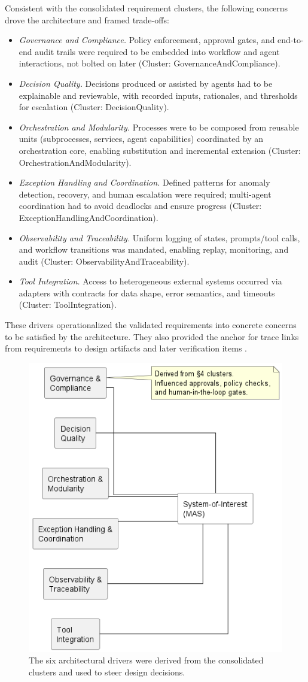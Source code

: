 Consistent with the consolidated requirement clusters, the following concerns drove the architecture and framed trade-offs:
\begin{itemize}
\item \emph{Governance and Compliance.} Policy enforcement, approval gates, and end-to-end audit trails were required to be embedded into workflow and agent interactions, not bolted on later (Cluster: GovernanceAndCompliance).
\item \emph{Decision Quality.} Decisions produced or assisted by agents had to be explainable and reviewable, with recorded inputs, rationales, and thresholds for escalation (Cluster: DecisionQuality).
\item \emph{Orchestration and Modularity.} Processes were to be composed from reusable units (subprocesses, services, agent capabilities) coordinated by an orchestration core, enabling substitution and incremental extension (Cluster: OrchestrationAndModularity).
\item \emph{Exception Handling and Coordination.} Defined patterns for anomaly detection, recovery, and human escalation were required; multi-agent coordination had to avoid deadlocks and ensure progress (Cluster: ExceptionHandlingAndCoordination).
\item \emph{Observability and Traceability.} Uniform logging of states, prompts/tool calls, and workflow transitions was mandated, enabling replay, monitoring, and audit (Cluster: ObservabilityAndTraceability).
\item \emph{Tool Integration.} Access to heterogeneous external systems occurred via adapters with contracts for data shape, error semantics, and timeouts (Cluster: ToolIntegration).
\end{itemize}
These drivers operationalized the validated requirements into concrete concerns to be satisfied by the architecture. They also provided the anchor for trace links from requirements to design artifacts and later verification items \parencite{IEEEStandard1990}.

\begin{figure}[H]
  \centering
  \includegraphics[width=0.49\linewidth]{ressources/MAS/figures/5_1b_drivers_overview.png}
  \caption{The six architectural drivers were derived from the consolidated clusters and used to steer design decisions.}\label{fig:5.1b-drivers-overview}
\end{figure}

